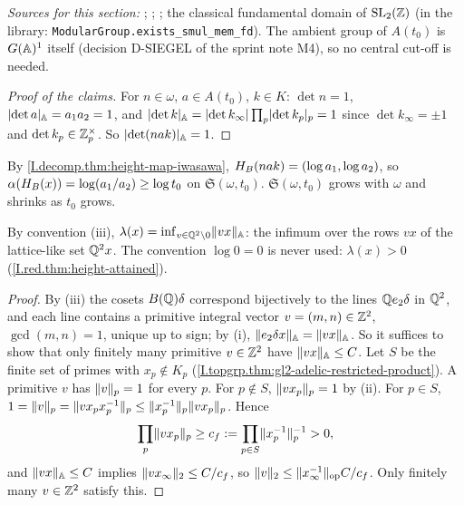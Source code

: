\noindent\emph{Sources for this section:} \cite[§6]{AIntro}; \cite[§1]{Bor-fin}; \cite[Lecture II]{Gel}; the classical
fundamental domain of $\mathrm{SL}_2(\mathbb{Z})$ (in the library: \texttt{ModularGroup.\allowbreak exists\_smul\_mem\_fd}). The ambient group of
$A(t_0)$ is $G(\mathbb{A})^1$ itself (decision D-SIEGEL of the sprint note M4), so no central cut-off is needed.

\begin{definition}
\end{definition}
\begin{proof}[Proof of the claims]
For $n\in\omega$, $a\in A(t_0)$, $k\in K$: $\det n=1$, $\lvert\det a\rvert_{\mathbb{A}}=a_1a_2=1$, and $\lvert\det k\rvert_{\mathbb{A}}=\lvert\det k_\infty\rvert\prod_p\lvert\det k_p\rvert_p=1$
since $\det k_\infty=\pm1$ and $\det k_p\in\mathbb{Z}_p^\times$. So $\lvert\det(nak)\rvert_{\mathbb{A}}=1$.
\end{proof}
\noindent By \cref{I.decomp.thm:height-map-iwasawa}, $H_B(nak)=(\log a_1,\log a_2)$, so $\alpha(H_B(x))=\log(a_1/a_2)\ge\log t_0$ on
$\mathfrak S(\omega,t_0)$. $\mathfrak S(\omega,t_0)$ grows with $\omega$ and shrinks as $t_0$ grows.

\begin{definition}[height]
\end{definition}
\noindent By convention (iii), $\lambda(x)=\inf_{v\in\mathbb{Q}^2\setminus0}\lVert vx\rVert_{\mathbb{A}}$: the infimum over the rows $vx$ of the lattice-like
set $\mathbb{Q}^2x$. The convention $\log0=0$ is never used: $\lambda(x)>0$ (\cref{I.red.thm:height-attained}).

\begin{lemma}
\end{lemma}
\begin{proof}
By (iii) the cosets $B(\mathbb{Q})\delta$ correspond bijectively to the lines $\mathbb{Q} e_2\delta$ in $\mathbb{Q}^2$, and each line contains a
primitive integral vector $v=(m,n)\in\mathbb{Z}^2$, $\gcd(m,n)=1$, unique up to sign; by (i), $\lVert e_2\delta x\rVert_{\mathbb{A}}=\lVert vx\rVert_{\mathbb{A}}$. So it
suffices to show that only finitely many primitive $v\in\mathbb{Z}^2$ have $\lVert vx\rVert_{\mathbb{A}}\le C$. Let $S$ be the finite set of primes with
$x_p\notin K_p$ (\cref{I.topgrp.thm:gl2-adelic-restricted-product}). A primitive $v$ has $\lVert v\rVert_p=1$ for every $p$. For $p\notin S$,
$\lVert vx_p\rVert_p=1$ by (ii). For $p\in S$, $1=\lVert v\rVert_p=\lVert vx_px_p^{-1}\rVert_p\le\lVert x_p^{-1}\rVert_p\lVert vx_p\rVert_p$. Hence
\[
  \prod_p\lVert vx_p\rVert_p\ge c_f:=\prod_{p\in S}\lVert x_p^{-1}\rVert_p^{-1}>0,
\]
and $\lVert vx\rVert_{\mathbb{A}}\le C$ implies $\lVert vx_\infty\rVert_2\le C/c_f$, so $\lVert v\rVert_2\le\lVert x_\infty^{-1}\rVert_{\mathrm{op}}C/c_f$. Only finitely many
$v\in\mathbb{Z}^2$ satisfy this.
\end{proof}

